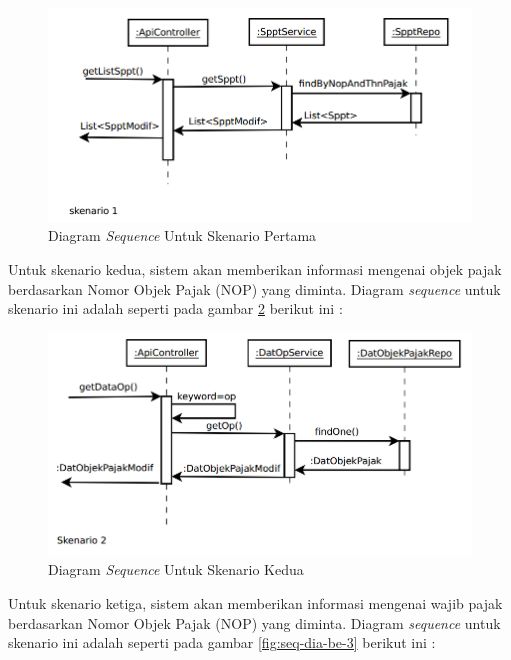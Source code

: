 \begin{figure}[H]
	\centering
	\includegraphics[width=1\textwidth]{./resources/uml/seq-dia-1}
	\caption{Diagram \textit{Sequence} Untuk Skenario Pertama}
	\label{fig:seq-dia-be-1}
\end{figure}

Untuk skenario kedua, sistem akan memberikan informasi mengenai objek pajak berdasarkan Nomor Objek Pajak (NOP) yang diminta. Diagram \textit{sequence} untuk skenario ini adalah seperti pada gambar \ref{fig:seq-dia-be-2} berikut ini :

\begin{figure}[H]
	\centering
	\includegraphics[width=1\textwidth]{./resources/uml/seq-dia-2}
	\caption{Diagram \textit{Sequence} Untuk Skenario Kedua}
	\label{fig:seq-dia-be-2}
\end{figure}

Untuk skenario ketiga, sistem akan memberikan informasi mengenai wajib pajak berdasarkan Nomor Objek Pajak (NOP) yang diminta. Diagram \textit{sequence} untuk skenario ini adalah seperti pada gambar \ref{fig:seq-dia-be-3} berikut ini :

